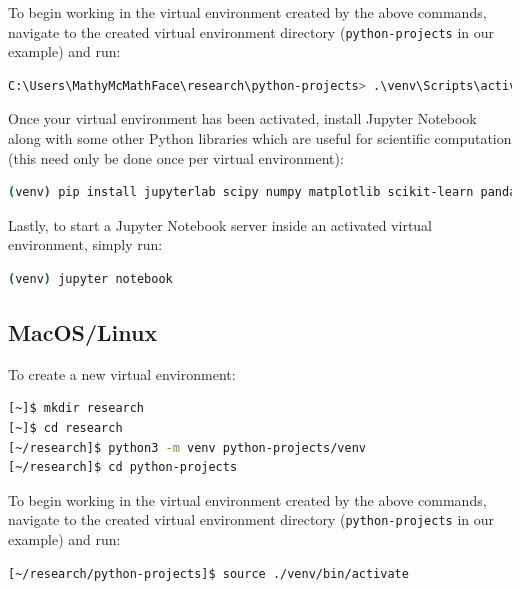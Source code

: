 \documentclass[12pt]{article}
\begin{document}
To begin working in the virtual environment created by the above commands, navigate to the 
created virtual environment directory (\texttt{python-projects} in our example) and run:

\begin{lstlisting}[language=bash, caption=Activate a Virtual Environment (Windows)]
C:\Users\MathyMcMathFace\research\python-projects> .\venv\Scripts\activate
\end{lstlisting}

Once your virtual environment has been activated, install Jupyter Notebook along with some other
Python libraries which are useful for scientific computation (this need only be done once per virtual
environment):

\begin{lstlisting}[language=bash, caption=Computational Python Libraries (Windows)]
(venv) pip install jupyterlab scipy numpy matplotlib scikit-learn pandas ipywidgets
\end{lstlisting}

Lastly, to start a Jupyter Notebook server inside an activated virtual environment, simply run:

\begin{lstlisting}[language=bash, caption=Start Jupyter Server (Windows)]
(venv) jupyter notebook
\end{lstlisting}

\pagebreak
\subsection{MacOS/Linux}\label{sec:appendix-a-macos-linux}

To create a new virtual environment:

\begin{lstlisting}[language=bash, caption=Create a Virtual Environment (MacOS/Linux)]
[~]$ mkdir research
[~]$ cd research
[~/research]$ python3 -m venv python-projects/venv
[~/research]$ cd python-projects
\end{lstlisting}

To begin working in the virtual environment created by the above commands, navigate to the 
created virtual environment directory (\texttt{python-projects} in our example) and run:

\begin{lstlisting}[language=bash, caption=Activate a Virtual Environment (MacOS/Linux)]
[~/research/python-projects]$ source ./venv/bin/activate
\end{lstlisting}
\end{document}
